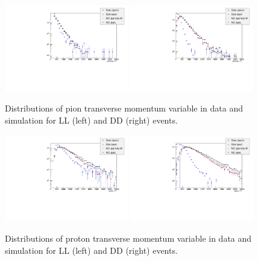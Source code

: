 \begin{figure}[h!]
\centering
\includegraphics[width=0.48\textwidth]{Lmumu/figs/MC_data_comp/piminus_PT_plotLL.pdf}
\includegraphics[width=0.48\textwidth]{Lmumu/figs/MC_data_comp/piminus_PT_plotDD.pdf}
\caption{ Distributions of pion transverse momentum variable in data and simulation for LL (left) and DD (right) events.   }
\end{figure}




\begin{figure}[h!]
\centering
\includegraphics[width=0.48\textwidth]{Lmumu/figs/MC_data_comp/pplus_PT_plotLL.pdf}
\includegraphics[width=0.48\textwidth]{Lmumu/figs/MC_data_comp/pplus_PT_plotDD.pdf}
\caption{ Distributions of proton transverse momentum variable in data and simulation for LL (left) and DD (right) events.   }
\end{figure}


